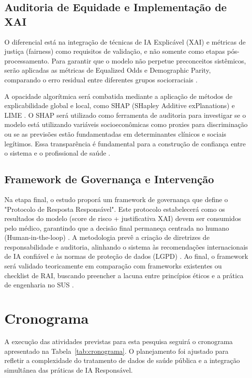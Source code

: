 \documentclass[12pt]{article}
\begin{document}
\subsection{Auditoria de Equidade e Implementação de XAI}
O diferencial está na integração de técnicas de IA Explicável (XAI) e métricas de justiça (fairness) como requisitos de validação, e não somente como etapas pós-processamento. Para garantir que o modelo não perpetue preconceitos sistêmicos, serão aplicadas as métricas de Equalized Odds e Demographic Parity, comparando o erro residual entre diferentes grupos sociorraciais \cite{FairnessAI2023, ViesAlgoritmico2024}.

A opacidade algorítmica será combatida mediante a aplicação de métodos de explicabilidade global e local, como SHAP (SHapley Additive exPlanations) e LIME \cite{Rajpurkar2022, ExplainableAI2023}. O SHAP será utilizado como ferramenta de auditoria para investigar se o modelo está utilizando variáveis socioeconômicas como proxies para discriminação ou se as previsões estão fundamentadas em determinantes clínicos e sociais legítimos. Essa transparência é fundamental para a construção de confiança entre o sistema e o profissional de saúde \cite{Shneiderman2021, Lekadir2023}.

\subsection{Framework de Governança e Intervenção}
Na etapa final, o estudo proporá um framework de governança que define o "Protocolo de Resposta Responsável". Este protocolo estabelecerá como os resultados do modelo (score de risco + justificativa XAI) devem ser consumidos pelo médico, garantindo que a decisão final permaneça centrada no humano (Human-in-the-loop) \cite{Dignum2022, Lu2022}. A metodologia prevê a criação de diretrizes de responsabilidade e auditoria, alinhando o sistema às recomendações internacionais de IA confiável e às normas de proteção de dados (LGPD) \cite{ResponsibleAI2024}. Ao final, o framework será validado teoricamente em comparação com frameworks existentes ou checklist de RAI, buscando preencher a lacuna entre princípios éticos e a prática de engenharia no SUS \cite{Atheniense2024, EBIA2021}.

\section{Cronograma}
A execução das atividades previstas para esta pesquisa seguirá o cronograma apresentado na Tabela~\ref{tab:cronograma}. O planejamento foi ajustado para refletir a complexidade do tratamento de dados de saúde pública e a integração simultânea das práticas de IA Responsável.
\end{document}
